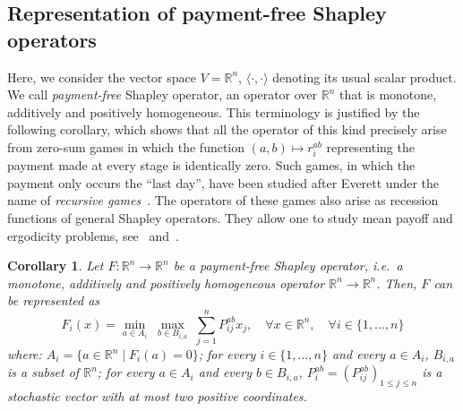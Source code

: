 \documentclass[a4paper,11pt]{amsart}
\newtheorem{corollary}[theorem]{Corollary}
\theoremstyle{definition}
\theoremstyle{remark}
\begin{document}
\subsection{Representation of payment-free Shapley operators}
Here, we consider the vector space $V={\mathbb{R}}^n$, ${\langle \cdot, \cdot\rangle}$ denoting its usual scalar product.
We call {\em payment-free} Shapley operator, an operator over ${\mathbb{R}}^n$ that is monotone, additively and positively homogeneous. This terminology is justified by the following corollary, which shows that all the operator of this kind precisely arise from zero-sum games
in which the function $(a,b)\mapsto r_i^{ab}$ representing the payment made
at every stage is identically zero. Such games, in which the payment only occurs
the ``last day'', have been studied after Everett under the name of {\em recursive games}~\cite{Eve57}. The operators of these games also arise as recession functions of general Shapley operators. They allow one to study mean payoff
and ergodicity problems, see~\cite{RS01a} and~\cite{AGH15}. 
\begin{corollary}
  \label{coro:PaymentFreeOperator}
  Let $F:{\mathbb{R}}^n \to {\mathbb{R}}^n$ be a payment-free Shapley operator, i.e.\ a monotone, additively and positively homogeneous operator ${\mathbb{R}}^n \to {\mathbb{R}}^n$.
  Then, $F$ can be represented as
  \begin{equation}
    \label{eq:PaymentFreeOperator}
    F_i(x) = \min_{a \in A_i} \; \max_{b \in B_{i,a}} \; \sum_{j=1}^n P_{i j}^{a b} x_j, \quad \forall x \in {\mathbb{R}}^n, \quad \forall i \in \{1,\dots,n\}
  \end{equation}
  where: $A_i = \{a \in {\mathbb{R}}^n \mid F_i(a)=0 \}$; for every $i \in \{1,\dots,n\}$ and every $a \in A_i$, $B_{i,a}$ is a subset of ${\mathbb{R}}^n$; for every $a \in A_i$ and every $b \in B_{i,a}$, $P_i^{a b} = (P_{i j}^{a b})_{1 {\leqslant} j {\leqslant} n}$ is a stochastic vector with at most two positive coordinates.
\end{corollary}

\end{document}
